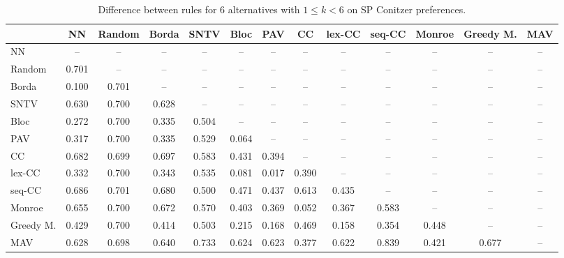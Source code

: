 
\begin{table*}[htbp]
\centering
\begin{tabular}{lcccccccccccc}
\toprule
 & NN & Random & Borda & SNTV & Bloc & PAV & CC & lex-CC & seq-CC & Monroe & Greedy M. & MAV \\
\midrule
NN & -- & -- & -- & -- & -- & -- & -- & -- & -- & -- & -- & -- \\
Random & \cellcolor{blue!70} 0.701 & -- & -- & -- & -- & -- & -- & -- & -- & -- & -- & -- \\
Borda & \cellcolor{blue!10} 0.100 & \cellcolor{blue!70} 0.701 & -- & -- & -- & -- & -- & -- & -- & -- & -- & -- \\
SNTV & \cellcolor{blue!63} 0.630 & \cellcolor{blue!70} 0.700 & \cellcolor{blue!62} 0.628 & -- & -- & -- & -- & -- & -- & -- & -- & -- \\
Bloc & \cellcolor{blue!27} 0.272 & \cellcolor{blue!70} 0.700 & \cellcolor{blue!33} 0.335 & \cellcolor{blue!50} 0.504 & -- & -- & -- & -- & -- & -- & -- & -- \\
PAV & \cellcolor{blue!31} 0.317 & \cellcolor{blue!70} 0.700 & \cellcolor{blue!33} 0.335 & \cellcolor{blue!52} 0.529 & \cellcolor{blue!6} 0.064 & -- & -- & -- & -- & -- & -- & -- \\
CC & \cellcolor{blue!68} 0.682 & \cellcolor{blue!69} 0.699 & \cellcolor{blue!69} 0.697 & \cellcolor{blue!58} 0.583 & \cellcolor{blue!43} 0.431 & \cellcolor{blue!39} 0.394 & -- & -- & -- & -- & -- & -- \\
lex-CC & \cellcolor{blue!33} 0.332 & \cellcolor{blue!70} 0.700 & \cellcolor{blue!34} 0.343 & \cellcolor{blue!53} 0.535 & \cellcolor{blue!8} 0.081 & \cellcolor{blue!1} 0.017 & \cellcolor{blue!39} 0.390 & -- & -- & -- & -- & -- \\
seq-CC & \cellcolor{blue!68} 0.686 & \cellcolor{blue!70} 0.701 & \cellcolor{blue!68} 0.680 & \cellcolor{blue!50} 0.500 & \cellcolor{blue!47} 0.471 & \cellcolor{blue!43} 0.437 & \cellcolor{blue!61} 0.613 & \cellcolor{blue!43} 0.435 & -- & -- & -- & -- \\
Monroe & \cellcolor{blue!65} 0.655 & \cellcolor{blue!70} 0.700 & \cellcolor{blue!67} 0.672 & \cellcolor{blue!56} 0.570 & \cellcolor{blue!40} 0.403 & \cellcolor{blue!36} 0.369 & \cellcolor{blue!5} 0.052 & \cellcolor{blue!36} 0.367 & \cellcolor{blue!58} 0.583 & -- & -- & -- \\
Greedy M. & \cellcolor{blue!42} 0.429 & \cellcolor{blue!70} 0.700 & \cellcolor{blue!41} 0.414 & \cellcolor{blue!50} 0.503 & \cellcolor{blue!21} 0.215 & \cellcolor{blue!16} 0.168 & \cellcolor{blue!46} 0.469 & \cellcolor{blue!15} 0.158 & \cellcolor{blue!35} 0.354 & \cellcolor{blue!44} 0.448 & -- & -- \\
MAV & \cellcolor{blue!62} 0.628 & \cellcolor{blue!69} 0.698 & \cellcolor{blue!64} 0.640 & \cellcolor{blue!73} 0.733 & \cellcolor{blue!62} 0.624 & \cellcolor{blue!62} 0.623 & \cellcolor{blue!37} 0.377 & \cellcolor{blue!62} 0.622 & \cellcolor{blue!83} 0.839 & \cellcolor{blue!42} 0.421 & \cellcolor{blue!67} 0.677 & -- \\
\bottomrule
\end{tabular}

\caption{Difference between rules for 6 alternatives with $1 \leq k < 6$ on SP Conitzer preferences.}
\label{tab:rule_distance_heatmap-m=[6]-pref_dist=single_peaked_conitzer}
\end{table*}
    